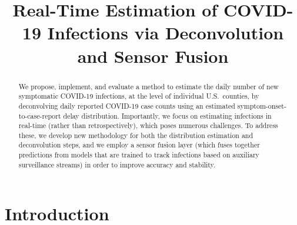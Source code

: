 \documentclass[sts]{imsart}
\theoremstyle{plain}
\theoremstyle{definition}
\theoremstyle{remark}
\begin{document}
\begin{frontmatter}
\title{Real-Time Estimation of COVID-19 Infections via Deconvolution and Sensor
  Fusion} 


\begin{abstract}
We propose, implement, and evaluate a method to estimate the daily number of new
symptomatic COVID-19 infections, at the level of individual U.S.\ counties, by
deconvolving daily reported COVID-19 case counts using an estimated
symptom-onset-to-case-report delay distribution. Importantly, we focus on
estimating infections in real-time (rather than retrospectively), which poses
numerous challenges. To address these, we develop new methodology for both the 
distribution estimation and deconvolution steps, and we employ a sensor fusion 
layer (which fuses together predictions from models that are trained to track
infections based on auxiliary surveillance streams) in order to improve accuracy
and stability. 
\end{abstract}

\begin{keyword}
\end{keyword}

\end{frontmatter}

\section{Introduction}
\label{sec:intro}
\end{document}
